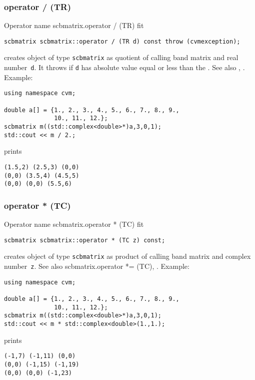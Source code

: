 \subsubsection{operator / (TR)}
Operator%
\pdfdest name {scbmatrix.operator / (TR)} fit
\begin{verbatim}
scbmatrix scbmatrix::operator / (TR d) const throw (cvmexception);
\end{verbatim}
creates  object of type \verb"scbmatrix" as  quotient of
 calling band matrix and  real number~\verb"d". It throws
if \verb"d" has  absolute value equal or less than the
.
See also ,
.
Example:
\begin{Verbatim}
using namespace cvm;

double a[] = {1., 2., 3., 4., 5., 6., 7., 8., 9.,
              10., 11., 12.};
scbmatrix m((std::complex<double>*)a,3,0,1);
std::cout << m / 2.;
\end{Verbatim}
prints
\begin{Verbatim}
(1.5,2) (2.5,3) (0,0)
(0,0) (3.5,4) (4.5,5)
(0,0) (0,0) (5.5,6)
\end{Verbatim}
\newpage



\subsubsection{operator * (TC)}
Operator%
\pdfdest name {scbmatrix.operator * (TC)} fit
\begin{verbatim}
scbmatrix scbmatrix::operator * (TC z) const;
\end{verbatim}
creates  object of type \verb"scbmatrix" as  product of
 calling band matrix and  complex number~\verb"z".
See also 
{scbmatrix.operator *= (TC)},
.
Example:
\begin{Verbatim}
using namespace cvm;

double a[] = {1., 2., 3., 4., 5., 6., 7., 8., 9.,
              10., 11., 12.};
scbmatrix m((std::complex<double>*)a,3,0,1);
std::cout << m * std::complex<double>(1.,1.);
\end{Verbatim}
prints
\begin{Verbatim}
(-1,7) (-1,11) (0,0)
(0,0) (-1,15) (-1,19)
(0,0) (0,0) (-1,23)
\end{Verbatim}
\newpage



